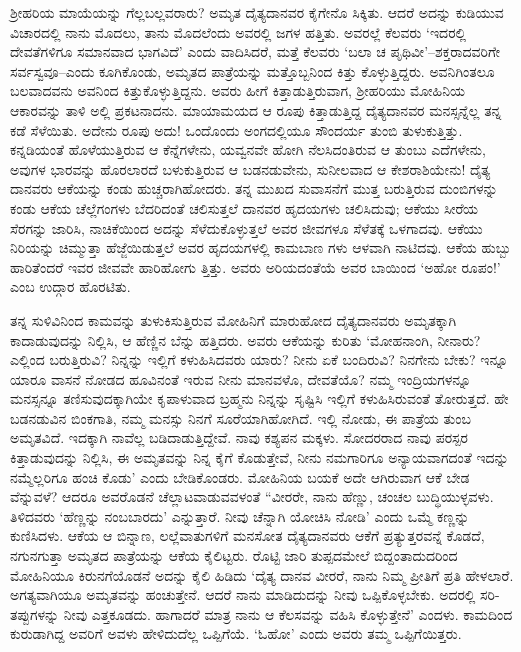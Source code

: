 ಶ್ರೀಹರಿಯ ಮಾಯೆಯನ್ನು ಗೆಲ್ಲಬಲ್ಲವರಾರು? ಅಮೃತ ದೈತ್ಯದಾನವರ ಕೈಗೇನೊ ಸಿಕ್ಕಿತು. ಆದರೆ ಅದನ್ನು ಕುಡಿಯುವ ವಿಚಾರದಲ್ಲಿ ನಾನು ಮೊದಲು, ತಾನು ಮೊದಲೆಂದು ಅವರಲ್ಲಿ ಜಗಳ ಹತ್ತಿತು. ಅವರಲ್ಲೆ ಕೆಲವರು ‘ಇದರಲ್ಲಿ ದೇವತೆಗಳಿಗೂ ಸಮಾನವಾದ ಭಾಗವಿದೆ’ ಎಂದು ವಾದಿಸಿದರೆ, ಮತ್ತೆ ಕೆಲವರು ‘ಬಲಾ ಚ ಪೃಥಿವೀ’–ಶಕ್ತರಾದವರಿಗೇ ಸರ್ವಸ್ವವೂ–ಎಂದು ಕೂಗಿಕೊಂಡು, ಅಮೃತದ ಪಾತ್ರೆಯನ್ನು ಮತ್ತೊಬ್ಬನಿಂದ ಕಿತ್ತು ಕೊಳ್ಳುತ್ತಿದ್ದರು. ಅವನಿಗಿಂತಲೂ ಬಲವಾದವನು ಅವನಿಂದ ಕಿತ್ತುಕೊಳ್ಳುತ್ತಿದ್ದನು. ಅವರು ಹೀಗೆ ಕಿತ್ತಾಡುತ್ತಿರುವಾಗ, ಶ್ರೀಹರಿಯು ಮೋಹಿನಿಯ ಆಕಾರವನ್ನು ತಾಳಿ ಅಲ್ಲಿ ಪ್ರಕಟನಾದನು. ಮಾಯಾಮಯದ ಆ ರೂಪು ಕಿತ್ತಾಡುತ್ತಿದ್ದ ದೈತ್ಯದಾನವರ ಮನಸ್ಸನ್ನೆಲ್ಲ ತನ್ನ ಕಡೆ ಸೆಳೆಯಿತು. ಅದೇನು ರೂಪು ಅದು! ಒಂದೊಂದು ಅಂಗದಲ್ಲಿಯೂ ಸೌಂದರ್ಯ ತುಂಬಿ ತುಳುಕುತ್ತಿತ್ತು. ಕನ್ನಡಿಯಂತೆ ಹೊಳೆಯುತ್ತಿರುವ ಆ ಕೆನ್ನೆಗಳೇನು, ಯವ್ವನವೇ ಹೋಗಿ ನೆಲಸಿದಂತಿರುವ ಆ ತುಂಬು ಎದೆಗಳೇನು, ಅವುಗಳ ಭಾರವನ್ನು ಹೊರಲಾರದೆ ಬಳುಕುತ್ತಿರುವ ಆ ಬಡನಡುವೇನು, ಸುನೀಲವಾದ ಆ ಕೇಶರಾಶಿಯೇನು! ದೈತ್ಯ ದಾನವರು ಆಕೆಯನ್ನು ಕಂಡು ಹುಚ್ಚರಾಗಿಹೋದರು. ತನ್ನ ಮುಖದ ಸುವಾಸನೆಗೆ ಮುತ್ತ ಬರುತ್ತಿರುವ ದುಂಬಿಗಳನ್ನು ಕಂಡು ಆಕೆಯ ಚೆಲ್ಲೆಗಂಗಳು ಬೆದರಿದಂತೆ ಚಲಿಸುತ್ತಲೆ ದಾನವರ ಹೃದಯಗಳು ಚಲಿಸಿದುವು; ಆಕೆಯು ಸೀರೆಯ ಸೆರಗನ್ನು ಜಾರಿಸಿ, ನಾಚಿಕೆಯಿಂದ ಅದನ್ನು ಸೆಳೆದುಕೊಳ್ಳುತ್ತಲೆ ಅವರ ಜೀವಗಳೂ ಸೆಳೆತಕ್ಕೆ ಒಳಗಾದವು. ಆಕೆಯು ನಿರಿಯನ್ನು ಚಿಮ್ಮುತ್ತಾ ಹೆಜ್ಜೆಯಿಡುತ್ತಲೆ ಅವರ ಹೃದಯಗಳಲ್ಲಿ ಕಾಮಬಾಣ ಗಳು ಆಳವಾಗಿ ನಾಟಿದವು. ಆಕೆಯ ಹುಬ್ಬು ಹಾರಿತೆಂದರೆ ಇವರ ಜೀವವೇ ಹಾರಿಹೋಗು ತ್ತಿತ್ತು. ಅವರು ಅರಿಯದಂತೆಯೆ ಅವರ ಬಾಯಿಂದ ‘ಅಹೋ ರೂಪಂ!’ ಎಂಬ ಉದ್ಗಾರ ಹೊರಟಿತು.

ತನ್ನ ಸುಳಿವಿನಿಂದ ಕಾಮವನ್ನು ತುಳುಕಿಸುತ್ತಿರುವ ಮೋಹಿನಿಗೆ ಮಾರುಹೋದ ದೈತ್ಯದಾನವರು ಅಮೃತಕ್ಕಾಗಿ ಕಾದಾಡುವುದನ್ನು ನಿಲ್ಲಿಸಿ, ಆ ಹೆಣ್ಣಿನ ಬೆನ್ನು ಹತ್ತಿದರು. ಅವರು ಆಕೆಯನ್ನು ಕುರಿತು ‘ಮೋಹನಾಂಗಿ, ನೀನಾರು? ಎಲ್ಲಿಂದ ಬರುತ್ತಿರುವಿ? ನಿನ್ನನ್ನು ಇಲ್ಲಿಗೆ ಕಳುಹಿಸಿದವರು ಯಾರು? ನೀನು ಏಕೆ ಬಂದಿರುವಿ? ನಿನಗೇನು ಬೇಕು? ಇನ್ನೂ ಯಾರೂ ವಾಸನೆ ನೋಡದ ಹೂವಿನಂತೆ ಇರುವ ನೀನು ಮಾನವಳೊ, ದೇವತೆಯೊ? ನಮ್ಮ ಇಂದ್ರಿಯಗಳನ್ನೂ ಮನಸ್ಸನ್ನೂ ತಣಿಸುವುದಕ್ಕಾಗಿಯೇ ಕೃಪಾಳುವಾದ ಬ್ರಹ್ಮನು ನಿನ್ನನ್ನು ಸೃಷ್ಟಿಸಿ ಇಲ್ಲಿಗೆ ಕಳುಹಿಸಿರುವಂತೆ ತೋರುತ್ತದೆ. ಹೇ ಬಡನಡುವಿನ ಬಿಂಕಗಾತಿ, ನಮ್ಮ ಮನಸ್ಸು ನಿನಗೆ ಸೂರೆಯಾಗಿಹೋಗಿದೆ. ಇಲ್ಲಿ ನೋಡು, ಈ ಪಾತ್ರೆಯ ತುಂಬ ಅಮೃತವಿದೆ. ಇದಕ್ಕಾಗಿ ನಾವೆಲ್ಲ ಬಡಿದಾಡುತ್ತಿದ್ದೇವೆ. ನಾವು ಕಶ್ಯಪನ ಮಕ್ಕಳು. ಸೋದರರಾದ ನಾವು ಪರಸ್ಪರ ಕಿತ್ತಾಡುವುದನ್ನು ನಿಲ್ಲಿಸಿ, ಈ ಅಮೃತವನ್ನು ನಿನ್ನ ಕೈಗೆ ಕೊಡುತ್ತೇವೆ, ನೀನು ನಮಗಾರಿಗೂ ಅನ್ಯಾಯವಾಗದಂತೆ ಇದನ್ನು ನಮ್ಮೆಲ್ಲರಿಗೂ ಹಂಚಿ ಕೊಡು’ ಎಂದು ಬೇಡಿಕೊಂಡರು. ಮೋಹಿನಿಯ ಬಯಕೆ ಅದೇ ಆಗಿರುವಾಗ ಆಕೆ ಬೇಡ ವೆನ್ನುವಳೆ? ಆದರೂ ಅವರೊಡನೆ ಚೆಲ್ಲಾಟವಾಡುವವಳಂತೆ “ವೀರರೇ, ನಾನು ಹೆಣ್ಣು, ಚಂಚಲ ಬುದ್ಧಿಯುಳ್ಳವಳು. ತಿಳಿದವರು ‘ಹೆಣ್ಣನ್ನು ನಂಬಬಾರದು’ ಎನ್ನುತ್ತಾರೆ. ನೀವು ಚೆನ್ನಾಗಿ ಯೋಚಿಸಿ ನೋಡಿ’ ಎಂದು ಒಮ್ಮೆ ಕಣ್ಣನ್ನು ಕುಣಿಸಿದಳು. ಆಕೆಯ ಆ ಬಿನ್ನಾಣ, ಲಲ್ಲೆವಾತುಗಳಿಗೆ ಮನಸೋತ ದೈತ್ಯದಾನವರು ಆಕೆಗೆ ಪ್ರತ್ಯುತ್ತರವನ್ನೆ ಕೊಡದೆ, ನಗುನಗುತ್ತಾ ಅಮೃತದ ಪಾತ್ರೆಯನ್ನು ಆಕೆಯ ಕೈಲಿಟ್ಟರು. ರೊಟ್ಟಿ ಜಾರಿ ತುಪ್ಪದಮೇಲೆ ಬಿದ್ದಂತಾದುದರಿಂದ ಮೋಹಿನಿಯೂ ಕಿರುನಗೆಯೊಡನೆ ಅದನ್ನು ಕೈಲಿ ಹಿಡಿದು ‘ದೈತ್ಯ ದಾನವ ವೀರರೆ, ನಾನು ನಿಮ್ಮ ಪ್ರೀತಿಗೆ ಪ್ರತಿ ಹೇಳಲಾರೆ. ಅಗತ್ಯವಾಗಿಯೂ ಅಮೃತವನ್ನು ಹಂಚುತ್ತೇನೆ. ಆದರೆ ನಾನು ಮಾಡಿದುದನ್ನು ನೀವು ಒಪ್ಪಿಕೊಳ್ಳಬೇಕು. ಅದರಲ್ಲಿ ಸರಿ- ತಪ್ಪುಗಳನ್ನು ನೀವು ಎತ್ತಕೂಡದು. ಹಾಗಾದರೆ ಮಾತ್ರ ನಾನು ಆ ಕೆಲಸವನ್ನು ವಹಿಸಿ ಕೊಳ್ಳುತ್ತೇನೆ’ ಎಂದಳು. ಕಾಮದಿಂದ ಕುರುಡಾಗಿದ್ದ ಅವರಿಗೆ ಅವಳು ಹೇಳಿದುದೆಲ್ಲ ಒಪ್ಪಿಗೆಯೆ. ‘ಓಹೋ’ ಎಂದು ಅವರು ತಮ್ಮ ಒಪ್ಪಿಗೆಯಿತ್ತರು.

